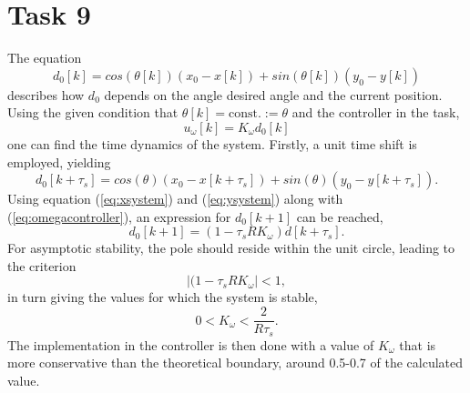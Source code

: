 \documentclass[a4paper,12pt,oneside,onecolumn]{article} %
\begin{document}
\section*{Task 9}
The equation 
\begin{equation}
    \label{eq:omegasystem}
    d_0[k] = cos(\theta[k])(x_0-x[k]) + sin(\theta[k])(y_0-y[k])
\end{equation}
describes how $d_0$ depends on the angle desired angle and the current
position. Using the given condition that $\theta[k] = \text{const.} :=
\theta$ and the controller in the task,
\begin{equation}
\label{eq:omegacontroller}
 	u_\omega [k] = K_\omega d_0 [k]
\end{equation} 	 
one can find the time dynamics of the system. Firstly, a unit time shift is employed, yielding
\begin{equation}
        d_0[k+\tau_s] = cos(\theta)(x_0-x[k+\tau_s]) + sin(\theta)(y_0-
        y[k+\tau_s]).  
\end{equation}
Using equation (\ref{eq:xsystem}) and (\ref{eq:ysystem}) along with (\ref{eq:omegacontroller}), an expression for $d_0[k+1]$ can be reached,
\begin{equation}
d_0[k+1] = \left( 1 - \tau_s R K_\omega \right )d[k + \tau_s] .
\end{equation}
For asymptotic stability, the pole should reside within the unit circle, leading to the criterion
\begin{equation}
\left| ( 1 - \tau_s R K_\omega \right| <1,
\end{equation}
in turn giving the values for which the system is stable,
\begin{equation}
0 < K_\omega < \frac{2}{R \tau_s}.
\end{equation}
The implementation in the controller is then done with a value of $K_\omega$ that is more conservative than the theoretical boundary, around 0.5-0.7 of the calculated value.
\end{document}
